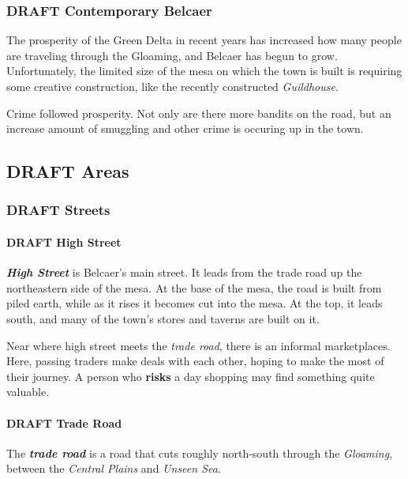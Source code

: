 \documentclass[11pt]{teraum_reference_book}
\begin{document}
\subsubsection*{{\bfseries\sffamily DRAFT} Contemporary Belcaer}
\label{sec:org0bc4159}
The prosperity of the Green Delta in recent years has increased how
many people are traveling through the Gloaming, and Belcaer has begun
to grow. Unfortunately, the limited size of the mesa on which the town
is built is requiring some creative construction, like the recently
constructed \emph{Guildhouse}.

Crime followed prosperity. Not only are there more bandits on the
road, but an increase amount of smuggling and other crime is occuring
up in the town.
\subsection*{{\bfseries\sffamily DRAFT} Areas}
\label{sec:org50b9680}
\subsubsection*{{\bfseries\sffamily DRAFT} Streets}
\label{sec:org9bdf985}
\paragraph{{\bfseries\sffamily DRAFT} High Street}
\label{sec:orgadb8d5a}
\textbf{\emph{High Street}} is Belcaer's main street. It leads from the trade road
up the northeastern side of the mesa. At the base of the mesa, the
road is built from piled earth, while as it rises it becomes cut into
the mesa. At the top, it leads south, and many of the town's stores
and taverns are built on it.

Near where high street meets the \emph{trade road}, there is an informal
marketplaces. Here, passing traders make deals with each other, hoping
to make the most of their journey. A person who \textbf{risks} a day shopping
may find something quite valuable.
\paragraph{{\bfseries\sffamily DRAFT} Trade Road}
\label{sec:org0cb2dd6}
The \textbf{\emph{trade road}} is a road that cuts roughly north-south through the
\emph{Gloaming}, between the \emph{Central Plains} and \emph{Unseen Sea}.
\end{document}
